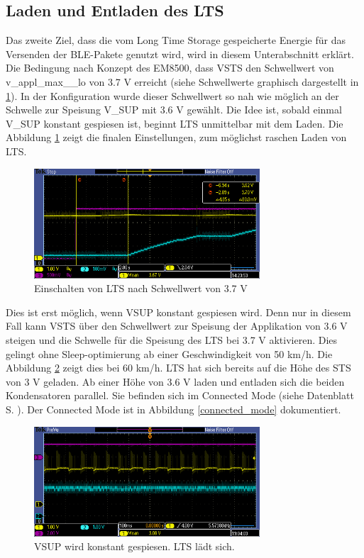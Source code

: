 \subsection{Laden und Entladen des LTS}
\label{res_entladen}

Das zweite Ziel, dass die vom Long Time Storage gespeicherte Energie für das Versenden der BLE-Pakete genutzt wird, wird in diesem Unterabschnitt erklärt. Die Bedingung nach Konzept des EM8500, dass VSTS den Schwellwert von v\_appl\_max\_\_lo von 3.7 V erreicht (siehe Schwellwerte graphisch dargestellt in \ref{lts_ein}). In der Konfiguration wurde dieser Schwellwert so nah wie möglich an der Schwelle zur Speisung V\_SUP mit 3.6 V gewählt. Die Idee ist, sobald einmal V\_SUP konstant gespiesen ist, beginnt LTS unmittelbar mit dem Laden. Die Abbildung \ref{lts_ein} zeigt die finalen Einstellungen, zum  möglichst raschen Laden von LTS.

\begin{figure}[ht]
   \includegraphics[width=0.75\textwidth]{4Resultate/imag/LTS_Ladeschwelle.PNG}
    \caption{Einschalten von LTS nach Schwellwert von 3.7 V}
    \label{lts_ein}
\end{figure}

Dies ist erst möglich, wenn VSUP konstant gespiesen wird. Denn nur in diesem Fall kann VSTS über den Schwellwert zur Speisung der Applikation von 3.6 V steigen und die Schwelle für die Speisung des LTS bei 3.7 V aktivieren. Dies gelingt ohne Sleep-optimierung ab einer Geschwindigkeit von 50 km/h. Die Abbildung \ref{vsup_konstant} zeigt dies bei 60 km/h. LTS hat sich bereits auf die Höhe des STS von 3 V geladen. Ab einer Höhe von 3.6 V laden und entladen sich die beiden Kondensatoren parallel. Sie befinden sich im Connected Mode (siehe Datenblatt S. ). Der Connected Mode ist in Abbildung \ref{connected_mode} dokumentiert.

\begin{figure}[ht]
   \includegraphics[width=0.75\textwidth]{4Resultate/imag/pic_5.PNG}
    \caption{VSUP wird konstant gespiesen. LTS lädt sich.}
    \label{vsup_konstant}
\end{figure}

